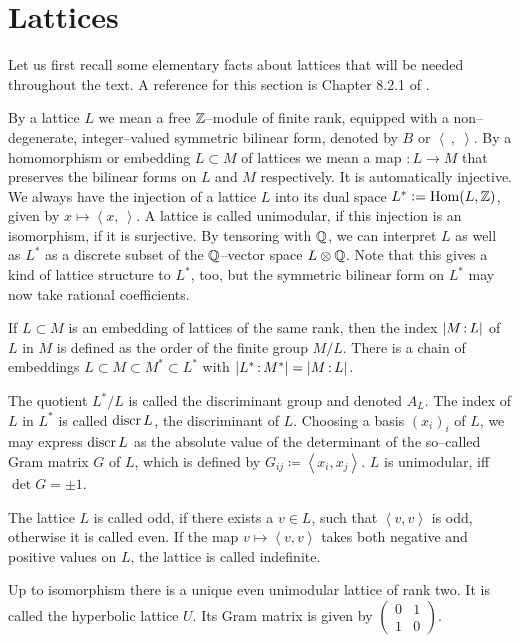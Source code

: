 
\chapter{Lattices}\label{latticeSubsection}
Let us first recall some elementary facts about lattices that will be needed throughout the text.
A reference for this section is Chapter 8.2.1 of \cite{Dolgachev}. 
\begin{definition}
By a lattice $L$ we mean a free $\mathbb{Z}$--module of finite rank, equipped with a non--degenerate, integer--valued symmetric bilinear form, denoted by $B$ or $\left<\ ,\;\right>$. 
By a homomorphism or embedding $L\subset M$ of lattices we mean a map $:L\rightarrow M$ that preserves the bilinear forms on $L$ and $M$ respectively. It is automatically injective. We always have the injection of a lattice $L$ into its dual space $L^*\vcentcolon= \operatorname{Hom}(L,\mathbb{Z})$, given by $x \mapsto \left<x,\ \right>$. A lattice is called unimodular, if this injection is an isomorphism, \ie if it is surjective. By tensoring with $\mathbb{Q}$, we can interpret $L$ as well as $L^*$ as a discrete subset of the $\mathbb{Q}$--vector space $L\otimes \mathbb{Q}$. Note that this gives a kind of lattice structure to $L^*$, too, but the symmetric bilinear form on $L^*$ may now take rational coefficients.


If $L\subset M$ is an embedding of lattices of the same rank, then the index $|M\,{:}\, L|$ of $L$ in $M$ is defined as the order of the finite group $M/L$.
There is a chain of embeddings $L\subset M \subset M^* \subset L^*$ with $|L^*\,{:}\, M^*| =|M\,{:}\, L| $.

The quotient $L^*/L$ is called the discriminant group and denoted $A_L$. The index of $L$ in $L^*$ is called $\operatorname{discr} L$, the discriminant of $L$.
Choosing a basis $(x_i)_i$ of $L$, we may express $\operatorname{discr} L$ as the absolute value of the determinant of the so--called Gram matrix $G$ of $L$, which is defined by $G_{ij}\coloneqq \left<x_i,x_j\right>$. $L$ is unimodular, iff $\det G =\pm 1$.

The lattice $L$ is called odd, if there exists a $v\in L$, such that $\left<v,v\right>$ is odd, otherwise it is called even. 
If the map $v \mapsto \left<v,v\right>$ takes both negative and positive values on $L$, the lattice is called indefinite. 
\end{definition}
\begin{example}
Up to isomorphism there is a unique even unimodular lattice of rank two. It is called the hyperbolic lattice $U$. Its Gram matrix is given by 
$\left(\begin{smallmatrix} 0&1\\ 1&0 \end{smallmatrix}\right)$.
\end{example}
